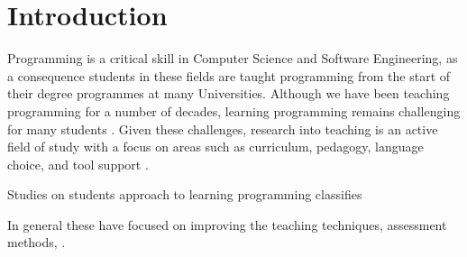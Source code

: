 \chapter{Introduction} %
\label{cha:introduction}

Programming is a critical skill in Computer Science and Software Engineering, as a consequence students in these fields are taught programming from the start of their degree programmes at many Universities. Although we have been teaching programming for a number of decades, learning programming remains challenging for many students \cite{Lister:2004,McCracken:2001,Ragonis:2007,Robins:2003,Rountree:2002,Wiedenbeck:2005}. 
Given these challenges, research into teaching \IP is an active field of study with a focus on areas such as curriculum, pedagogy, language choice, and tool support \cite{Pears:2007}. 



Studies on students approach to learning programming classifies 
\cite{Bruce:2003}









In general these have focused on improving the teaching techniques, assessment methods, .


